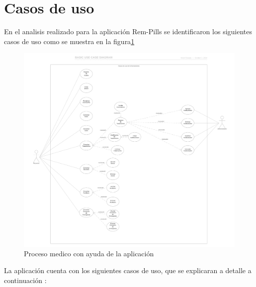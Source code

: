 \section{Casos de uso}
En el analisis realizado para la aplicación Rem-Pills se identificaron los siguientes casos de uso como se muestra en la figura\ref{fig:casosdeuso}
\begin{figure}[htb]
	\centering
	\includegraphics[width=1.1\textwidth]{images/cap2/casosdeuso}
	\caption{Proceso medico con ayuda de la aplicación} \label{fig:casosdeuso}
\end{figure} 
La aplicación cuenta con los siguientes casos de uso, que se explicaran a detalle a continuación :

